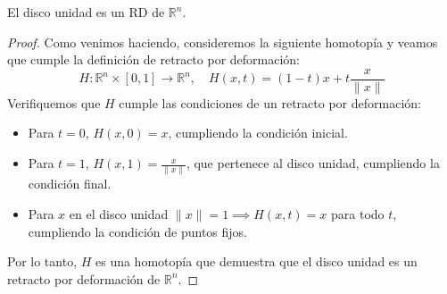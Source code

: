 \documentclass{article}
\theoremstyle{plain}
\theoremstyle{definition}
\newcommand{\R}{\mathbb{R}}
\newenvironment{ejercicio}[1]{\begin{trivlist}
\item[\hskip \labelsep {\bfseries Ejercicio}\hskip \labelsep {\bfseries #1.}]}{\end{trivlist}}
\begin{document}
\begin{ejercicio}{12}
    El disco unidad es un RD de \(\R^n\).
\end{ejercicio}
\begin{proof}
    Como venimos haciendo, consideremos la siguiente homotopía y veamos que cumple la definición de retracto por deformación:
    \[
        H : \R^n \times [0, 1] \to \R^n, \quad H(x, t) = (1-t)x + t\frac{x}{\|x\|}
    \]
    Verifiquemos que \( H \) cumple las condiciones de un retracto por deformación:
    \begin{itemize}
        \item Para \( t=0 \), \( H(x, 0) = x \), cumpliendo la condición inicial.
        \item Para \( t=1 \), \( H(x, 1) = \frac{x}{\|x\|} \), que pertenece al disco unidad, cumpliendo la condición final.
        \item Para \( x \) en el disco unidad \( \| x \| = 1 \implies H(x, t) = x \) para todo \( t \), cumpliendo la condición de puntos fijos.
    \end{itemize}
    Por lo tanto, \( H \) es una homotopía que demuestra que el disco unidad es un retracto por deformación de \(\R^n\).
\end{proof}

\vspace{0.5cm}
\end{document}
